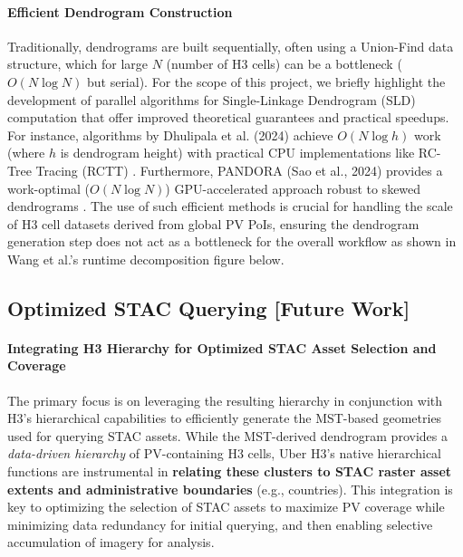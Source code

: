 \paragraph{Efficient Dendrogram Construction}
Traditionally, dendrograms are built sequentially, often using a Union-Find data structure, which for large $N$ (number of H3 cells) can be a bottleneck ($O(N \log N)$ but serial). 
For the scope of this project, we briefly highlight the development of parallel algorithms for Single-Linkage Dendrogram (SLD) computation that offer improved theoretical guarantees and practical speedups. 
For instance, algorithms by Dhulipala et al. (2024) achieve $O(N \log h)$ work (where $h$ is dendrogram height) with practical CPU implementations like RC-Tree Tracing (RCTT) \cite{dhulipala_Optimal_Parallel_Dendrogram_2024}. 
Furthermore, PANDORA (Sao et al., 2024) provides a work-optimal ($O(N \log N)$) GPU-accelerated approach robust to skewed dendrograms \cite{sao_PANDORA_GPU_Dendrogram_2024}. 
The use of such efficient methods is crucial for handling the scale of H3 cell datasets derived from global PV PoIs, ensuring the dendrogram generation step does not act as a bottleneck for the overall workflow 
as shown in Wang et al.'s runtime decomposition figure \cite{Wang_Fast_Parallel_EMST_HDBSCAN_2021} below.

\subsection{Optimized STAC Querying [Future Work]}

\paragraph{Integrating H3 Hierarchy for Optimized STAC Asset Selection and Coverage}
The primary focus is on leveraging the resulting hierarchy in conjunction with H3's hierarchical capabilities to efficiently generate the MST-based geometries used for querying STAC assets.
While the MST-derived dendrogram provides a \textit{data-driven hierarchy} of PV-containing H3 cells, Uber H3's native hierarchical functions are instrumental in \textbf{relating these clusters to STAC raster asset extents and administrative boundaries} (e.g., countries). 
This integration is key to optimizing the selection of STAC assets to maximize PV coverage while minimizing data redundancy for initial querying, and then enabling selective accumulation of imagery for analysis.

